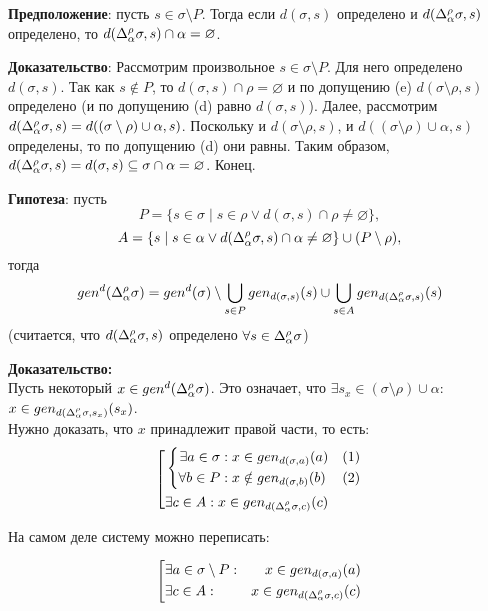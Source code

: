 \textbf{Предположение}: пусть $s \in \sigma \setminus P$. Тогда если $d(\sigma, s)$ определено и $d(\Delta_\alpha^\rho\sigma, s)$ определено, то $d(\Delta_\alpha^\rho\sigma, s) \cap \alpha = \varnothing$.

\textbf{Доказательство}: Рассмотрим произвольное $s \in \sigma \setminus P$. Для него определено $d(\sigma, s)$. Так как $s \notin P$, то $d(\sigma, s) \cap \rho = \varnothing$ и по допущению (e) $d(\sigma \setminus \rho, s)$ определено (и по допущению (d) равно $d(\sigma, s)$). Далее, рассмотрим $d(\Delta_\alpha^\rho\sigma, s) = d((\sigma\setminus\rho)\cup\alpha, s)$. Поскольку и $d(\sigma \setminus \rho, s)$, и $d((\sigma\setminus\rho)\cup\alpha, s)$ определены, то по допущению (d) они равны. Таким образом, $d(\Delta_\alpha^\rho\sigma, s) = d(\sigma, s) \subseteq \sigma \cap \alpha = \varnothing$. Конец.

\hrulefill

\textbf{Гипотеза}: пусть
$$P = \{s \in \sigma \mid s \in \rho \vee d(\sigma, s) \cap \rho \neq \varnothing \},$$
$$A = \{s \mid s \in \alpha \vee d(\Delta_\alpha^\rho\sigma, s) \cap \alpha \neq \varnothing \} \cup (P \setminus \rho),$$
тогда
$$gen^d(\Delta_\alpha^\rho\sigma) = gen^d(\sigma) \setminus \bigcup\limits_{s \in P} gen_{d(\sigma, s)}(s) \cup \bigcup\limits_{s \in A} gen_{d(\Delta_\alpha^\rho\sigma, s)}(s)$$
(считается, что $d(\Delta_\alpha^\rho\sigma, s)$ определено $\forall s \in \Delta_\alpha^\rho\sigma$)

\textbf{Доказательство:}\\
Пусть некоторый $x \in gen^d(\Delta_\alpha^\rho\sigma)$. Это означает, что $\exists s_x \in (\sigma \setminus \rho) \cup \alpha$: $x \in gen_{d(\Delta_\alpha^\rho\sigma, s_x)} (s_x)$.\\
Нужно доказать, что $x$ принадлежит правой части, то есть:
$$
\left[
\begin{aligned}
	&\left\{
	\begin{aligned}
		\exists a \in \sigma&: x \in gen_{d(\sigma, a)} (a) &(1)\\
		\forall b \in P&: x \notin gen_{d(\sigma, b)} (b) &(2)\\
	\end{aligned}
	\right.\\
	&\exists c \in A: x \in gen_{d(\Delta_\alpha^\rho\sigma, c)} (c)\\
\end{aligned}
\right.
$$

На самом деле систему можно переписать:

$$
\left[
\begin{aligned}
	&\exists a \in \sigma \setminus P: &x \in gen_{d(\sigma, a)} (a)\\
	&\exists c \in A: &x \in gen_{d(\Delta_\alpha^\rho\sigma, c)} (c)\\
\end{aligned}
\right.
$$

